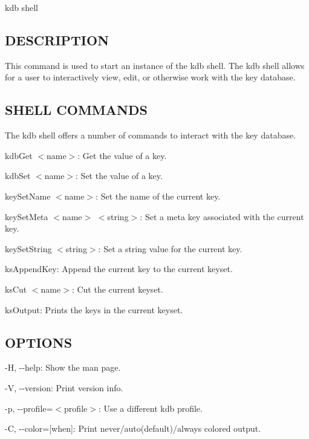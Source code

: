 {\ttfamily kdb shell}

\subsection*{D\+E\+S\+C\+R\+I\+P\+T\+I\+O\+N}

This command is used to start an instance of the kdb shell. The kdb shell allows for a user to interactively view, edit, or otherwise work with the key database.

\subsection*{S\+H\+E\+L\+L C\+O\+M\+M\+A\+N\+D\+S}

The kdb shell offers a number of commands to interact with the key database.


\begin{DoxyItemize}
\item {\ttfamily kdb\+Get $<$name$>$}\+: Get the value of a key.
\item {\ttfamily kdb\+Set $<$name$>$}\+: Set the value of a key.
\item {\ttfamily key\+Set\+Name $<$name$>$}\+: Set the name of the current key.
\item {\ttfamily key\+Set\+Meta $<$name$>$ $<$string$>$}\+: Set a meta key associated with the current key.
\item {\ttfamily key\+Set\+String $<$string$>$}\+: Set a string value for the current key.
\item {\ttfamily ks\+Append\+Key}\+: Append the current key to the current keyset.
\item {\ttfamily ks\+Cut $<$name$>$}\+: Cut the current keyset.
\item {\ttfamily ks\+Output}\+: Prints the keys in the current keyset.
\end{DoxyItemize}

\subsection*{O\+P\+T\+I\+O\+N\+S}


\begin{DoxyItemize}
\item {\ttfamily -\/\+H}, {\ttfamily -\/-\/help}\+: Show the man page.
\item {\ttfamily -\/\+V}, {\ttfamily -\/-\/version}\+: Print version info.
\item {\ttfamily -\/p}, {\ttfamily -\/-\/profile}=$<$profile$>$\+: Use a different kdb profile.
\item {\ttfamily -\/\+C}, {\ttfamily -\/-\/color}=\mbox{[}when\mbox{]}\+: Print never/auto(default)/always colored output.
\end{DoxyItemize}


